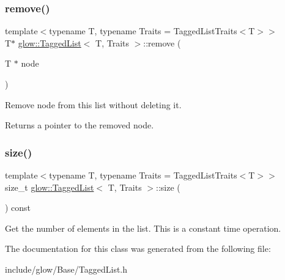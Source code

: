 \subsubsection{\texorpdfstring{remove()}{remove()}}
{\footnotesize\ttfamily template$<$typename T, typename Traits = Tagged\+List\+Traits$<$\+T$>$$>$ \\
T$\ast$ \hyperlink{classglow_1_1_tagged_list}{glow\+::\+Tagged\+List}$<$ T, Traits $>$\+::remove (\begin{DoxyParamCaption}\item[{T $\ast$}]{node }\end{DoxyParamCaption})\hspace{0.3cm}{\ttfamily [inline]}}

Remove {\ttfamily node} from this list without deleting it.

Returns a pointer to the removed node. \mbox{\label{classglow_1_1_tagged_list_a9dc997e0e492eba4629b85270abace0c}} 
\subsubsection{\texorpdfstring{size()}{size()}}
{\footnotesize\ttfamily template$<$typename T, typename Traits = Tagged\+List\+Traits$<$\+T$>$$>$ \\
size\+\_\+t \hyperlink{classglow_1_1_tagged_list}{glow\+::\+Tagged\+List}$<$ T, Traits $>$\+::size (\begin{DoxyParamCaption}{ }\end{DoxyParamCaption}) const\hspace{0.3cm}{\ttfamily [inline]}}

Get the number of elements in the list. This is a constant time operation. 

The documentation for this class was generated from the following file\+:\begin{DoxyCompactItemize}
\item 
include/glow/\+Base/Tagged\+List.\+h\end{DoxyCompactItemize}
